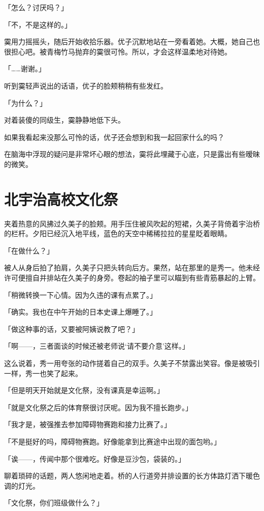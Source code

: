 \documentclass[UTF8]{ctexart}
\begin{document}
    「怎么？讨厌吗？」

    「不，不是这样的。」

    霙用力摇摇头，随后开始收拾乐器。优子沉默地站在一旁看着她。大概，她自己也很担心吧。被青梅竹马抛弃的霙很可怜。所以，才会这样温柔地对待她。

    「……谢谢。」

    听到霙轻声说出的话语，优子的脸颊稍稍有些发红。

    「为什么？」

    对着装傻的同级生，霙静静地低下头。

    如果我看起来没那么可怜的话，优子还会想到和我一起回家什么的吗？

    在脑海中浮现的疑问是非常坏心眼的想法，霙将此埋藏于心底，只是露出有些暧昧的微笑。
    \section{北宇治高校文化祭}
    夹着热意的风拂过久美子的脸颊。用手压住被风吹起的短裙，久美子背倚着宇治桥的栏杆。夕阳已经沉入地平线，蓝色的天空中稀稀拉拉的星星眨着眼睛。

    「在做什么？」

    被人从身后拍了拍肩，久美子只把头转向后方。果然，站在那里的是秀一。他未经许可便擅自并排站在久美子的身旁。卷起的袖子里可以瞄到有些青筋暴起的上臂。

    「稍微转换一下心情。因为久违的课有点累了。」

    「确实。我也在中午开始的日本史课上爆睡了。」

    「做这种事的话，又要被阿姨说教了吧？」

    「啊——，三者面谈的时候还被老师说‘请不要介意’这样。」

    这么说着，秀一用夸张的动作搓着自己的双手。久美子不禁露出笑容。像是被吸引一样，秀一也笑了起来。

    「但是明天开始就是文化祭，没有课真是幸运啊。」

    「就是文化祭之后的体育祭很讨厌呢。因为我不擅长跑步。」

    「我才是，被强推去参加障碍物赛跑和接力比赛了。」

    「不是挺好的吗，障碍物赛跑。好像能拿到比赛途中出现的面包哟。」

    「诶——，传闻中那个很难吃。好像是豆沙包，袋装的。」

    聊着琐碎的话题，两人悠闲地走着。桥的人行道旁并排设置的长方体路灯洒下暖色调的灯光。

    「文化祭，你们班级做什么？」
\end{document}
